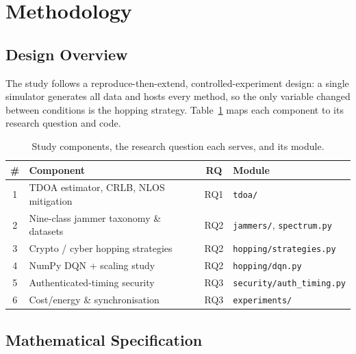 \documentclass[11pt]{article}
\begin{document}
\section{Methodology}\label{sec:method}
\subsection{Design Overview}
The study follows a reproduce-then-extend, controlled-experiment design: a
single simulator generates all data and hosts every method, so the only variable
changed between conditions is the hopping strategy. Table~\ref{tab:phases} maps
each component to its research question and code.

\begin{table}[H]\centering
\caption{Study components, the research question each serves, and its module.}
\label{tab:phases}\small
\begin{tabular}{clcl}\toprule
\textbf{\#} & \textbf{Component} & \textbf{RQ} & \textbf{Module} \\ \midrule
1 & TDOA estimator, CRLB, NLOS mitigation & RQ1 & \texttt{tdoa/} \\
2 & Nine-class jammer taxonomy \& datasets & RQ2 & \texttt{jammers/}, \texttt{spectrum.py} \\
3 & Crypto / cyber hopping strategies & RQ2 & \texttt{hopping/strategies.py} \\
4 & NumPy DQN + scaling study & RQ2 & \texttt{hopping/dqn.py} \\
5 & Authenticated-timing security & RQ3 & \texttt{security/auth\_timing.py} \\
6 & Cost/energy \& synchronisation & RQ3 & \texttt{experiments/} \\ \bottomrule
\end{tabular}
\end{table}

\subsection{Mathematical Specification}
\end{document}
